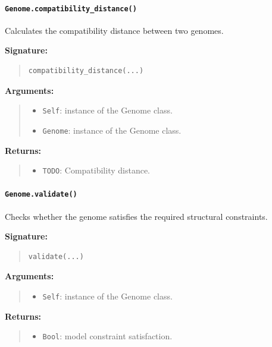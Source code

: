 \documentclass[11pt]{article}
\begin{document}
\paragraph{\texttt{Genome.compatibility\_distance()}}

Calculates the compatibility distance between two genomes.

\textbf{Signature:}
\begin{quote}
\begin{verbatim}
compatibility_distance(...)
\end{verbatim}
\end{quote}

\textbf{Arguments:}
\begin{quote}
\begin{itemize}
    \item \texttt{Self}: instance of the Genome class.
    \item \texttt{Genome}: instance of the Genome class.
\end{itemize}
\end{quote}

\textbf{Returns:}
\begin{quote}
\begin{itemize}
    \item \texttt{TODO}: Compatibility distance.
\end{itemize}
\end{quote}

\paragraph{\texttt{Genome.validate()}}

Checks whether the genome satisfies the required structural constraints.

\textbf{Signature:}
\begin{quote}
\begin{verbatim}
validate(...)
\end{verbatim}
\end{quote}

\textbf{Arguments:}
\begin{quote}
\begin{itemize}
    \item \texttt{Self}: instance of the Genome class.
\end{itemize}
\end{quote}

\textbf{Returns:}
\begin{quote}
\begin{itemize}
    \item \texttt{Bool}: model constraint satisfaction.
\end{itemize}
\end{quote}
\end{document}
